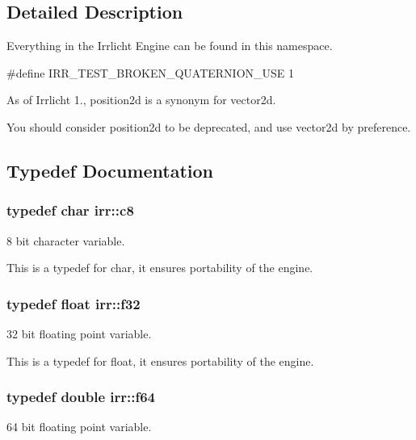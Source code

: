 \subsection{Detailed Description}
Everything in the Irrlicht Engine can be found in this namespace. 

\#define I\+R\+R\+\_\+\+T\+E\+S\+T\+\_\+\+B\+R\+O\+K\+E\+N\+\_\+\+Q\+U\+A\+T\+E\+R\+N\+I\+O\+N\+\_\+\+U\+SE 1

As of Irrlicht 1., position2d is a synonym for vector2d.

You should consider position2d to be deprecated, and use vector2d by preference. 

\subsection{Typedef Documentation}
\subsubsection[{\texorpdfstring{c8}{c8}}]{\setlength{\rightskip}{0pt plus 5cm}typedef char {\bf irr\+::c8}}\hypertarget{namespaceirr_a9395eaea339bcb546b319e9c96bf7410}{}\label{namespaceirr_a9395eaea339bcb546b319e9c96bf7410}


8 bit character variable. 

This is a typedef for char, it ensures portability of the engine. 
\subsubsection[{\texorpdfstring{f32}{f32}}]{\setlength{\rightskip}{0pt plus 5cm}typedef float {\bf irr\+::f32}}\hypertarget{namespaceirr_a0277be98d67dc26ff93b1a6a1d086b07}{}\label{namespaceirr_a0277be98d67dc26ff93b1a6a1d086b07}


32 bit floating point variable. 

This is a typedef for float, it ensures portability of the engine. 
\subsubsection[{\texorpdfstring{f64}{f64}}]{\setlength{\rightskip}{0pt plus 5cm}typedef double {\bf irr\+::f64}}\hypertarget{namespaceirr_a1325b02603ad449f92c68fc640af9b28}{}\label{namespaceirr_a1325b02603ad449f92c68fc640af9b28}


64 bit floating point variable. 

